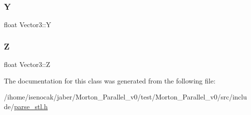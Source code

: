 \subsubsection{\texorpdfstring{Y}{Y}}
{\footnotesize\ttfamily float Vector3\+::Y}

\mbox{\label{classVector3_a78d01dc0845b9f17b51c972effdc495a}} 
\subsubsection{\texorpdfstring{Z}{Z}}
{\footnotesize\ttfamily float Vector3\+::Z}



The documentation for this class was generated from the following file\+:\begin{DoxyCompactItemize}
\item 
/ihome/isenocak/jaber/\+Morton\+\_\+\+Parallel\+\_\+v0/test/\+Morton\+\_\+\+Parallel\+\_\+v0/src/include/\mbox{\hyperlink{parse__stl_8h}{parse\+\_\+stl.\+h}}\end{DoxyCompactItemize}
